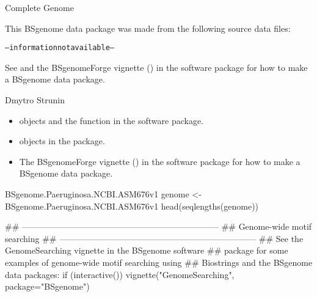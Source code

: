 \documentclass[letterpaper]{book}
\begin{document}
%
\begin{Description}\relax
Complete Genome
\end{Description}
%
\begin{Note}\relax
This BSgenome data package was made from the following source data files:
\begin{alltt}
-- information not available --
  \end{alltt}


See  and the BSgenomeForge
vignette () in the 
software package for how to make a BSgenome data package.
\end{Note}
%
\begin{Author}\relax
Dmytro Strunin
\end{Author}
%
\begin{SeeAlso}\relax
\begin{itemize}

\item{}  objects and the
 function
in the  software package.
\item{}  objects in the 
package.
\item{} The BSgenomeForge vignette ()
in the  software package for how to make a BSgenome
data package.

\end{itemize}

\end{SeeAlso}
%
\begin{Examples}
\begin{ExampleCode}
BSgenome.Paeruginosa.NCBI.ASM676v1
genome <- BSgenome.Paeruginosa.NCBI.ASM676v1
head(seqlengths(genome))


## ---------------------------------------------------------------------
## Genome-wide motif searching
## ---------------------------------------------------------------------
## See the GenomeSearching vignette in the BSgenome software
## package for some examples of genome-wide motif searching using
## Biostrings and the BSgenome data packages:
if (interactive())
    vignette("GenomeSearching", package="BSgenome")
\end{ExampleCode}
\end{Examples}
\printindex{}
\end{document}
